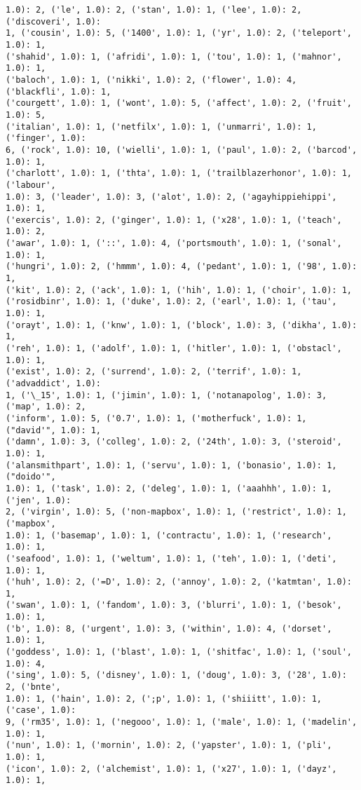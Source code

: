 \documentclass[11pt]{article}
\begin{document}
\begin{Verbatim}[commandchars=\\\{\}]
1.0): 2, ('le', 1.0): 2, ('stan', 1.0): 1, ('lee', 1.0): 2, ('discoveri', 1.0):
1, ('cousin', 1.0): 5, ('1400', 1.0): 1, ('yr', 1.0): 2, ('teleport', 1.0): 1,
('shahid', 1.0): 1, ('afridi', 1.0): 1, ('tou', 1.0): 1, ('mahnor', 1.0): 1,
('baloch', 1.0): 1, ('nikki', 1.0): 2, ('flower', 1.0): 4, ('blackfli', 1.0): 1,
('courgett', 1.0): 1, ('wont', 1.0): 5, ('affect', 1.0): 2, ('fruit', 1.0): 5,
('italian', 1.0): 1, ('netfilx', 1.0): 1, ('unmarri', 1.0): 1, ('finger', 1.0):
6, ('rock', 1.0): 10, ('wielli', 1.0): 1, ('paul', 1.0): 2, ('barcod', 1.0): 1,
('charlott', 1.0): 1, ('thta', 1.0): 1, ('trailblazerhonor', 1.0): 1, ('labour',
1.0): 3, ('leader', 1.0): 3, ('alot', 1.0): 2, ('agayhippiehippi', 1.0): 1,
('exercis', 1.0): 2, ('ginger', 1.0): 1, ('x28', 1.0): 1, ('teach', 1.0): 2,
('awar', 1.0): 1, ('::', 1.0): 4, ('portsmouth', 1.0): 1, ('sonal', 1.0): 1,
('hungri', 1.0): 2, ('hmmm', 1.0): 4, ('pedant', 1.0): 1, ('98', 1.0): 1,
('kit', 1.0): 2, ('ack', 1.0): 1, ('hih', 1.0): 1, ('choir', 1.0): 1,
('rosidbinr', 1.0): 1, ('duke', 1.0): 2, ('earl', 1.0): 1, ('tau', 1.0): 1,
('orayt', 1.0): 1, ('knw', 1.0): 1, ('block', 1.0): 3, ('dikha', 1.0): 1,
('reh', 1.0): 1, ('adolf', 1.0): 1, ('hitler', 1.0): 1, ('obstacl', 1.0): 1,
('exist', 1.0): 2, ('surrend', 1.0): 2, ('terrif', 1.0): 1, ('advaddict', 1.0):
1, ('\_15', 1.0): 1, ('jimin', 1.0): 1, ('notanapolog', 1.0): 3, ('map', 1.0): 2,
('inform', 1.0): 5, ('0.7', 1.0): 1, ('motherfuck', 1.0): 1, ("david'", 1.0): 1,
('damn', 1.0): 3, ('colleg', 1.0): 2, ('24th', 1.0): 3, ('steroid', 1.0): 1,
('alansmithpart', 1.0): 1, ('servu', 1.0): 1, ('bonasio', 1.0): 1, ("doido'",
1.0): 1, ('task', 1.0): 2, ('deleg', 1.0): 1, ('aaahhh', 1.0): 1, ('jen', 1.0):
2, ('virgin', 1.0): 5, ('non-mapbox', 1.0): 1, ('restrict', 1.0): 1, ('mapbox',
1.0): 1, ('basemap', 1.0): 1, ('contractu', 1.0): 1, ('research', 1.0): 1,
('seafood', 1.0): 1, ('weltum', 1.0): 1, ('teh', 1.0): 1, ('deti', 1.0): 1,
('huh', 1.0): 2, ('=D', 1.0): 2, ('annoy', 1.0): 2, ('katmtan', 1.0): 1,
('swan', 1.0): 1, ('fandom', 1.0): 3, ('blurri', 1.0): 1, ('besok', 1.0): 1,
('b', 1.0): 8, ('urgent', 1.0): 3, ('within', 1.0): 4, ('dorset', 1.0): 1,
('goddess', 1.0): 1, ('blast', 1.0): 1, ('shitfac', 1.0): 1, ('soul', 1.0): 4,
('sing', 1.0): 5, ('disney', 1.0): 1, ('doug', 1.0): 3, ('28', 1.0): 2, ('bnte',
1.0): 1, ('hain', 1.0): 2, (';p', 1.0): 1, ('shiiitt', 1.0): 1, ('case', 1.0):
9, ('rm35', 1.0): 1, ('negooo', 1.0): 1, ('male', 1.0): 1, ('madelin', 1.0): 1,
('nun', 1.0): 1, ('mornin', 1.0): 2, ('yapster', 1.0): 1, ('pli', 1.0): 1,
('icon', 1.0): 2, ('alchemist', 1.0): 1, ('x27', 1.0): 1, ('dayz', 1.0): 1,

\end{Verbatim}
\end{document}
